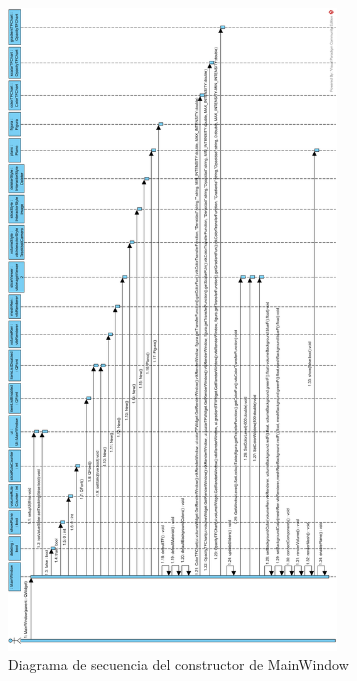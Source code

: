 \begin{figure}[H]
	\centering
	\includegraphics[height=17cm]{imagenes/diagramas/secuencia/MainWindow_New}
	\caption{Diagrama de secuencia del constructor de MainWindow}
	\label{fig:diagrama_secuencia_mainWindow_new}
\end{figure}

